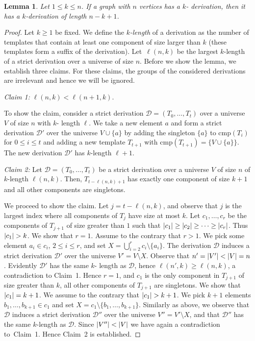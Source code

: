 \documentclass[10pt,usletter]{article}
\newtheorem{lemma}{Lemma}
\theoremstyle{remark}
\newcommand{\DDD}{\mathcal{D}}
\newcommand{\hy}{\hbox{-}\nobreak\hskip0pt}
\newcommand{\comps}{\text{cmp}}
\begin{document}
\begin{lemma}\label{lem:strict-shorter}
  Let $1\leq k\leq n$.  If a graph with $n$ vertices has a $k$\hy
  derivation, then it has a $k$\hy derivation of length $n-k+1$.
\end{lemma}
\begin{proof}
  Let $k\geq 1$ be fixed.  We define the \emph{$k$\hy length} of a
  derivation as the number of templates that contain at least one
  component of size larger than $k$ (these templates form a suffix of
  the derivation).  Let~$\ell(n,k)$ be the largest $k$\hy length of a
  strict derivation over a universe of size $n$.  Before we show the
  lemma, we establish three claims. For these claims, the groups of
  the considered derivations are irrelevant and hence we will be ignored.

  \smallskip\noindent\emph{Claim 1:}   $\ell(n,k)<\ell(n+1,k)$.
  
  To show the claim, consider a strict derivation
  $\DDD=(T_0,\dots,T_t)$ over a universe $V$ of size $n$ with $k$\hy
  length $\ell$. We take a new element $a$ and form a strict
  derivation $\DDD'$ over the universe $V \cup \{a\}$ by adding the
  singleton $\{a\}$ to $\comps(T_i)$ for $0\leq i \leq t$ and adding a
  new template $T_{t+1}$ with $\comps(T_{t+1})= \{V \cup \{a\}\}$. The
  new derivation $\DDD'$ has $k$\hy length $\ell+1$.

  \smallskip\noindent\emph{Claim 2:} Let $\DDD=(T_0,\dots,T_t)$ be a
  strict derivation over a universe $V$ of size $n$ of $k$\hy length
  $\ell(n,k)$. Then,  $T_{t-\ell(n,k)+1}$ has exactly one component of
  size $k+1$ and all other components are singletons.
 

  We proceed to show the claim. Let $j=t-\ell(n,k)$, and observe that
  $j$ is the largest index where all components of $T_j$ have size at
  most $k$. Let $c_1,\dots,c_r$ be the components of $T_{j+1}$ of size
  greater than $1$ such that $|c_1| \geq |c_2| \geq \dots
  \geq |c_r|$. Thus $\Card{c_1}>k$.  We show that $r=1$. Assume
  to the contrary that $r>1$. We pick some element $a_i\in c_i$,
  $2\leq i \leq r$, and set $X= \bigcup_{i=2}^r c_i\setminus
  \{a_i\}$. The derivation $\DDD$ induces a strict derivation $\DDD'$
  over the universe $V'=V\setminus X$. Observe that
  $n'=\Card{V'}<\Card{V}=n$.  Evidently $\DDD'$ has the same $k$\hy
  length as $\DDD$, hence $\ell(n',k)\geq \ell(n,k)$, a contradiction
  to Claim~1. Hence $r=1$, and $c_1$ is the only component in
  $T_{j+1}$ of size greater than $k$, all other components of
  $T_{j+1}$ are singletons. We show that $|c_1|=k+1$. We assume
  to the contrary that $\Card{c_1}>k+1$. We pick $k+1$ elements
  $b_1,\dots,b_{k+1} \in c_1$ and set $X=c_1\setminus
  \{b_1,\dots,b_{k+1}\}$.  Similarly as above, we observe that $\DDD$
  induces a strict derivation $\DDD''$ over the universe
  $V''=V'\setminus X$, and that $\DDD''$ has the same $k$\hy length as
  $\DDD$. Since $\Card{V''}<\Card{V}$ we have again a contradiction
  to~Claim~1.  Hence Claim~2 is established.



\end{proof}
\end{document}
